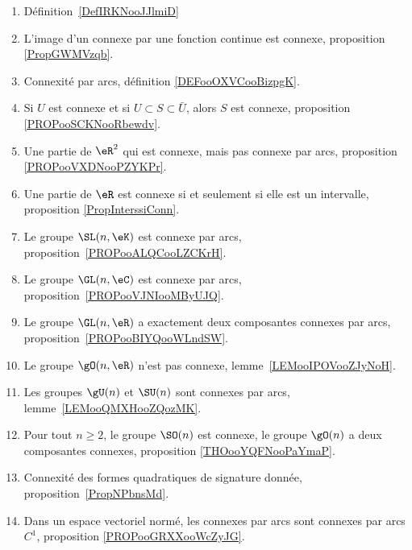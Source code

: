 
\begin{enumerate}
	\item
	      Définition~\ref{DefIRKNooJJlmiD}
	\item
	      L'image d'un connexe par une fonction continue est connexe, proposition \ref{PropGWMVzqb}.
	\item
	      Connexité par arcs, définition \ref{DEFooOXVCooBizpgK}.
	\item
        Si \( U\) est connexe et si \( U\subset S\subset \bar U\), alors \( S\) est connexe, proposition \ref{PROPooSCKNooRbewdv}.
    \item
	      Une partie de \( \eR^2\) qui est connexe, mais pas connexe par arcs, proposition \ref{PROPooVXDNooPZYKPr}.
	\item
	      Une partie de \( \eR\) est connexe si et seulement si elle est un intervalle, proposition \ref{PropInterssiConn}.
	\item
	      Le groupe \( \SL(n,\eK)\) est connexe par arcs, proposition~\ref{PROPooALQCooLZCKrH}.
	\item
	      Le groupe \( \GL(n,\eC)\) est connexe par arcs, proposition~\ref{PROPooVJNIooMByUJQ}.
	\item
	      Le groupe \( \GL(n,\eR)\) a exactement deux composantes connexes par arcs, proposition~\ref{PROPooBIYQooWLndSW}.
	\item
	      Le groupe \( \gO(n,\eR)\) n'est pas connexe, lemme~\ref{LEMooIPOVooZJyNoH}.
	\item
	      Les groupes \( \gU(n)\) et \( \SU(n)\) sont connexes par arcs, lemme~\ref{LEMooQMXHooZQozMK}.
	\item
	      Pour tout \( n\geq 2\), le groupe \( \SO(n)\) est connexe, le groupe \( \gO(n)\) a deux composantes connexes, proposition \ref{THOooYQFNooPaYmaP}.
	\item
	      Connexité des formes quadratiques de signature donnée, proposition~\ref{PropNPbnsMd}.
      \item
          Dans un espace vectoriel normé, les connexes par arcs sont connexes par arcs \( C^1\), proposition \ref{PROPooGRXXooWcZyJG}.
\end{enumerate}

